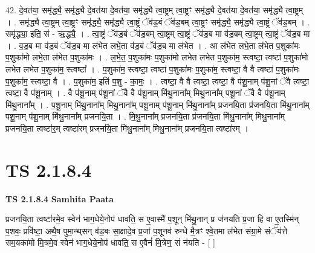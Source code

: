 \documentclass[17pt]{extarticle}
\begin{document}
42. दे॒वत॑या॒ समृ॑द्ध्यै॒ समृ॑द्ध्यै दे॒वत॑या दे॒वत॑या॒ समृ॑द्ध्यै त्वा॒ष्ट्रम् त्वा॒ष्ट्रꣳ समृ॑द्ध्यै दे॒वत॑या दे॒वत॑या॒ समृ॑द्ध्यै त्वा॒ष्ट्रम् । . समृ॑द्ध्यै त्वा॒ष्ट्रम् त्वा॒ष्ट्रꣳ समृ॑द्ध्यै॒ समृ॑द्ध्यै त्वा॒ष्ट्रं ॅव॑ड॒बं ॅव॑ड॒बम् त्वा॒ष्ट्रꣳ समृ॑द्ध्यै॒ समृ॑द्ध्यै त्वा॒ष्ट्रं ॅव॑ड॒बम् । . समृ॑द्ध्या॒ इति॒ सं - ऋ॒द्ध्यै॒ । . त्वा॒ष्ट्रं ॅव॑ड॒बं ॅव॑ड॒बम् त्वा॒ष्ट्रम् त्वा॒ष्ट्रं ॅव॑ड॒ब मा व॑ड॒बम् त्वा॒ष्ट्रम् त्वा॒ष्ट्रं ॅव॑ड॒ब मा । . व॒ड॒ब मा व॑ड॒बं ॅव॑ड॒ब मा ल॑भेत लभे॒ता व॑ड॒बं ॅव॑ड॒ब मा ल॑भेत । . आ ल॑भेत लभे॒ता ल॑भेत प॒शुका॑मः प॒शुका॑मो लभे॒ता ल॑भेत प॒शुका॑मः । . ल॒भे॒त॒ प॒शुका॑मः प॒शुका॑मो लभेत लभेत प॒शुका॑म॒ स्त्वष्टा॒ त्वष्टा॑ प॒शुका॑मो लभेत लभेत प॒शुका॑म॒ स्त्वष्टा᳚ । . प॒शुका॑म॒ स्त्वष्टा॒ त्वष्टा॑ प॒शुका॑मः प॒शुका॑म॒ स्त्वष्टा॒ वै वै त्वष्टा॑ प॒शुका॑मः प॒शुका॑म॒ स्त्वष्टा॒ वै । . प॒शुका॑म॒ इति॑ प॒शु - का॒मः॒ । . त्वष्टा॒ वै वै त्वष्टा॒ त्वष्टा॒ वै प॑शू॒नाम् प॑शू॒नां ॅवै त्वष्टा॒ त्वष्टा॒ वै प॑शू॒नाम् । . वै प॑शू॒नाम् प॑शू॒नां ॅवै वै प॑शू॒नाम् मि॑थु॒नाना᳚म् मिथु॒नाना᳚म् पशू॒नां ॅवै वै प॑शू॒नाम् मि॑थु॒नाना᳚म् । . प॒शू॒नाम् मि॑थु॒नाना᳚म् मिथु॒नाना᳚म् पशू॒नाम् प॑शू॒नाम् मि॑थु॒नाना᳚म् प्रजनयि॒ता प्र॑जनयि॒ता मि॑थु॒नाना᳚म् पशू॒नाम् प॑शू॒नाम् मि॑थु॒नाना᳚म् प्रजनयि॒ता । . मि॒थु॒नाना᳚म् प्रजनयि॒ता प्र॑जनयि॒ता मि॑थु॒नाना᳚म् मिथु॒नाना᳚म् प्रजनयि॒ता त्वष्टा॑र॒म् त्वष्टा॑रम् प्रजनयि॒ता मि॑थु॒नाना᳚म् मिथु॒नाना᳚म् प्रजनयि॒ता त्वष्टा॑रम् । \newline
\pagebreak
{}
\section*{ TS 2.1.8.4 }

\textbf{TS 2.1.8.4 } \newline
\textbf{Samhita Paata} \newline

प्रजनयि॒ता त्वष्टा॑रमे॒व स्वेन॑ भाग॒धेये॒नोप॑ धावति॒ स ए॒वास्मै॑ प॒शून् मि॑थु॒नान् प्र ज॑नयति प्र॒जा हि वा ए॒तस्मि॑न् प॒शवः॒ प्रवि॑ष्टा॒ अथै॒ष पुमा॒न्थ्‌सन् व॑ड॒बः सा॒क्षादे॒व प्र॒जां प॒शूनव॑ रुन्धे मै॒त्रꣳ श्वे॒तमा ल॑भेत संग्रा॒मे संॅय॑त्ते सम॒यका॑मो मि॒त्रमे॒व स्वेन॑ भाग॒धेये॒नोप॑ धावति॒ स ए॒वैनं॑ मि॒त्रेण॒ सं न॑यति - [  ] \newline
\end{document}
